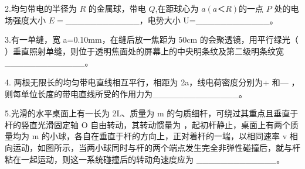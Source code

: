 2.均匀带电的半径为 $R$ 的金属球，带电 $Q$,在距球心为 $a(a＜R)$的一点 $P$ 处的电场强度大小 $E=$____________，电势大小 U=____________。

3.有一单缝，宽 a=0.10mm，在缝后放一焦距为 50cm 的会聚透镜，用平行绿光（ ）垂直照射单缝，则位于透明焦面处的屏幕上的中央明条纹及第二级明条纹宽_____________。

4. 两根无限长的均匀带电直线相互平行，相距为 2a，线电荷密度分别为+ 和— ，则每单位长度的带电直线所受的作用力为______________。

5.光滑的水平桌面上有一长为 2L、质量为 m 的匀质细杆，可绕过其重点且垂直于杆的竖直光滑固定轴 O 自由转动，其转动惯量为 ，起初杆静止，桌面上有两个质量均为 m 的小球，各自在垂直于杆的方向上，正对着杆的一端，以相同速率 v 相向运动，如图所示，当两小球同时与杆的两个端点发生完全非弹性碰撞后，就与杆粘在一起运动，则这一系统碰撞后的转动角速度应为 _____________。